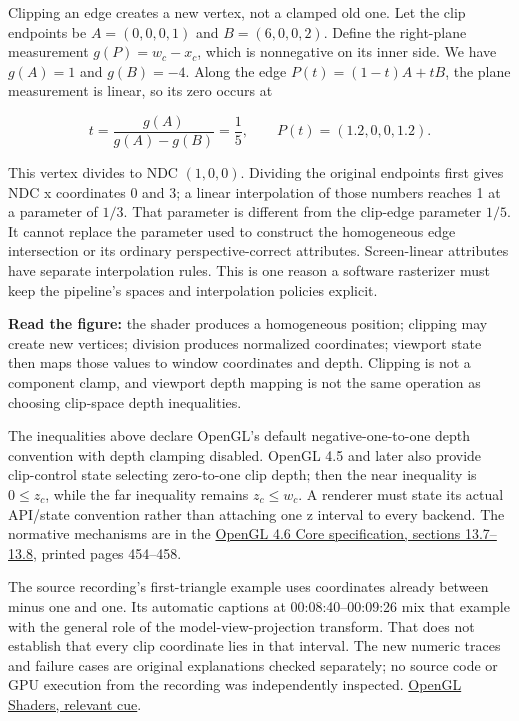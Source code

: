 Clipping an edge creates a new vertex, not a clamped old one. Let the clip endpoints be \(A=(0,0,0,1)\) and \(B=(6,0,0,2)\). Define the right-plane measurement \(g(P)=w_c-x_c\), which is nonnegative on its inner side. We have \(g(A)=1\) and \(g(B)=-4\). Along the edge \(P(t)=(1-t)A+tB\), the plane measurement is linear, so its zero occurs at

\[
t=\frac{g(A)}{g(A)-g(B)}=\frac15,
\qquad P(t)=(1.2,0,0,1.2).
\]

This vertex divides to NDC \((1,0,0)\). Dividing the original endpoints first gives NDC x coordinates 0 and 3; a linear interpolation of those numbers reaches 1 at a parameter of \(1/3\). That parameter is different from the clip-edge parameter \(1/5\). It cannot replace the parameter used to construct the homogeneous edge intersection or its ordinary perspective-correct attributes. Screen-linear attributes have separate interpolation rules. This is one reason a software rasterizer must keep the pipeline's spaces and interpolation policies explicit.


\textbf{Read the figure:} the shader produces a homogeneous position; clipping may create new vertices; division produces normalized coordinates; viewport state then maps those values to window coordinates and depth. Clipping is not a component clamp, and viewport depth mapping is not the same operation as choosing clip-space depth inequalities.

The inequalities above declare OpenGL's default negative-one-to-one depth convention with depth clamping disabled. OpenGL 4.5 and later also provide clip-control state selecting zero-to-one clip depth; then the near inequality is \(0\leq z_c\), while the far inequality remains \(z_c\leq w_c\). A renderer must state its actual API/state convention rather than attaching one z interval to every backend. The normative mechanisms are in the \href{https://registry.khronos.org/OpenGL/specs/gl/glspec46.core.pdf}{OpenGL 4.6 Core specification, sections 13.7--13.8}, printed pages 454--458.

The source recording's first-triangle example uses coordinates already between minus one and one. Its automatic captions at 00:08:40--00:09:26 mix that example with the general role of the model-view-projection transform. That does not establish that every clip coordinate lies in that interval. The new numeric traces and failure cases are original explanations checked separately; no source code or GPU execution from the recording was independently inspected. \href{https://www.youtube.com/watch?v=QBCCHm_9HV8&t=520s}{OpenGL Shaders, relevant cue}.

